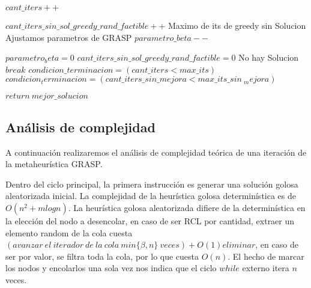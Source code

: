 \begin{algorithmic}[1]
	        	    	
	        	\EndIf
	
	        	\State $cant\_iters++$
	    	
	    	    	\Else
	    	    	\State $cant\_iters\_sin\_sol\_greedy\_rand\_factible++$
	    	    		\Comment Maximo de its de greedy sin Solucion
	    	    	            	\Comment Ajustamos parametros de GRASP
	    	    	                \State $parametro\_beta--$
	    	    	            \EndIf
	
	        	    	\State $parametro_beta = 0$
	        		\EndIf
	        		\State $cant\_iters\_sin\_sol\_greedy\_rand\_factible = 0$
	        	\EndIf
        	\EndIf
        \Else
        \Comment No hay Solucion
        	\State $break$
        \EndIf	
           \State $condicion\_terminacion = (cant\_iters < max\_its)$            
            \State $condicion_terminacion = (cant\_iters\_sin\_mejora < max\_its\_sin\ _mejora)$
        \EndIf

       \EndWhile

       \State $return\:  mejor\_solucion$

\EndProcedure
\end{algorithmic}


\subsection{An\'alisis de complejidad}

A continuaci\'on realizaremos el an\'alisis de complejidad te\'orica de una iteraci\'on de la metaheur\'istica GRASP.
\vspace{2mm}


 Dentro del ciclo principal, la primera instrucci\'on es generar una soluci\'on golosa aleatorizada inicial. La complejidad de la heur\'istica golosa determin\'istica es de $O(n^2 + m log n)$. La heur\'istica golosa aleatorizada difiere de la determin\'istica en la elecci\'on del nodo a desencolar, en caso de ser RCL por cantidad, extraer un elemento random de la cola cuesta $(avanzar\: el\: iterador\: de\: la \:cola \:min\{\beta, n\}\:veces)+O(1) eliminar$, en caso de ser por valor, se filtra toda la cola, por lo que cuesta $O(n)$. El hecho de marcar los nodos y encolarlos una sola vez nos indica que el ciclo $while$ externo itera $n$ veces.


